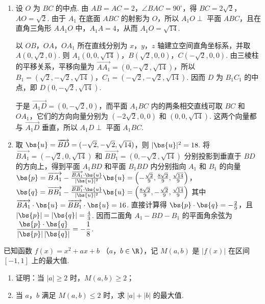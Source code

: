 \begin{solution}
\begin{enumerate}
\item 设 \(O\) 为 \(BC\) 的中点. 由 \(AB=AC=2\)，\(\angle BAC=90^{\circ}\)，得 \(BC=2\sqrt{2}\)，\(AO=\sqrt{2}\). 由于 \(A_1\) 在底面 \(ABC\) 的射影为 \(O\)，所以 \(A_1O\perp\) 平面 \(ABC\)，且在直角三角形 \(AA_1O\) 中，\(A_1A=4\)，从而 \(A_1O=\sqrt{14}\).

以 \(OB\)，\(OA\)，\(OA_1\) 所在直线分别为 \(x\)，\(y\)，\(z\) 轴建立空间直角坐标系，并取
\(A(0,\sqrt{2},0)\). 则
\(A_1(0,0,\sqrt{14})\)，\(B(\sqrt{2},0,0)\)，\(C(-\sqrt{2},0,0)\). 由三棱柱的平移关系，平移向量为
\(\overrightarrow{AA_1}=(0,-\sqrt{2},\sqrt{14})\)，所以 \(B_1=(\sqrt{2},-\sqrt{2},\sqrt{14})\)，\(C_1=(-\sqrt{2},-\sqrt{2},\sqrt{14})\). 因而 \(D\) 为 \(B_1C_1\) 的中点，即 \(D(0,-\sqrt{2},\sqrt{14})\).

于是 \(\overrightarrow{A_1D}=(0,-\sqrt{2},0)\)，而平面 \(A_1BC\) 内的两条相交直线可取 \(BC\) 和 \(OA_1\)，它们的方向向量分别为 \((-2\sqrt{2},0,0)\) 和 \((0,0,\sqrt{14})\). 这两个向量都与 \(\overrightarrow{A_1D}\) 垂直，所以 \(A_1D\perp\) 平面 \(A_1BC\).

\item 取 \(\bs{u}=\overrightarrow{BD}=(-\sqrt{2},-\sqrt{2},\sqrt{14})\)，则 \(|\bs{u}|^2=18\). 将 \(\overrightarrow{BA_1}=(-\sqrt{2},0,\sqrt{14})\) 和 \(\overrightarrow{BB_1}=(0,-\sqrt{2},\sqrt{14})\) 分别投影到垂直于 \(BD\) 的方向上，得到平面 \(A_1BD\) 和平面 \(B_1BD\) 内分别指向 \(A_1\) 和 \(B_1\) 的向量
\(\bs{p}=\overrightarrow{BA_1}-\frac{\overrightarrow{BA_1}\cdot\bs{u}}{|\bs{u}|^2}\bs{u}=\left(-\frac{\sqrt{2}}{9},\frac{8\sqrt{2}}{9},\frac{\sqrt{14}}{9}\right)\)，\(\bs{q}=\overrightarrow{BB_1}-\frac{\overrightarrow{BB_1}\cdot\bs{u}}{|\bs{u}|^2}\bs{u}=\left(\frac{8\sqrt{2}}{9},-\frac{\sqrt{2}}{9},\frac{\sqrt{14}}{9}\right)\)
其中 \(\overrightarrow{BA_1}\cdot\bs{u}=\overrightarrow{BB_1}\cdot\bs{u}=16\). 直接计算得 \(\bs{p}\cdot\bs{q}=-\frac{2}{9}\)，且 \(|\bs{p}|=|\bs{q}|=\frac{4}{3}\). 因而二面角 \(A_1-BD-B_1\) 的平面角余弦为
\(\dfrac{\bs{p}\cdot\bs{q}}{|\bs{p}|\,|\bs{q}|}=-\dfrac{1}{8}\).
\end{enumerate}
\end{solution}

\begin{problem}
已知函数 \( f(x) = x^2 + ax + b \) （\(a\)，\(b \in \R\)），记 \( M(a, b) \) 是 \( |f(x)| \) 在区间 \([-1, 1]\) 上的最大值.
\begin{enumerate}
\item 证明：当 \(|a| \geqslant 2\) 时，\(M(a, b) \geqslant 2\)；
\item 当 \(a\)，\(b\) 满足 \(M(a, b) \leqslant 2\) 时，求 \(|a| + |b|\) 的最大值.
\end{enumerate}
\end{problem}

